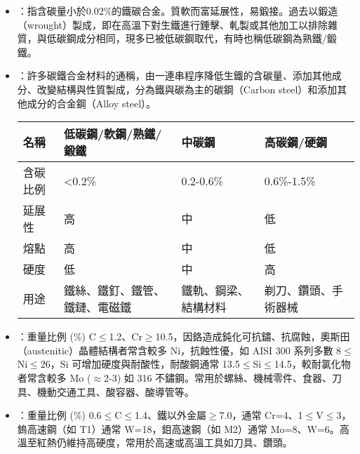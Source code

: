 \documentclass[a4paper,12pt]{report}
\begin{document}
\begin{itemize}
\item {}：指含碳量小於0.02\%的鐵碳合金。質軟而富延展性，易鍛接。過去以鍛造（wrought）製成，即在高溫下對生鐵進行錘擊、軋製或其他加工以排除雜質，與低碳鋼成分相同，現多已被低碳鋼取代，有時也稱低碳鋼為熟鐵/鍛鐵。
\item {}：許多碳鐵合金材料的通稱，由一連串程序降低生鐵的含碳量、添加其他成分、改變結構與性質製成，分為鐵與碳為主的碳鋼（Carbon steel）和添加其他成分的合金鋼（Alloy steel）。
\eit
{}
\begin{longtable}[c]{|p{0.2\tw}|p{0.2\tw}|p{0.2\tw}|p{0.2\tw}|}
\hline
名稱 & 低碳鋼/軟鋼/熟鐵/鍛鐵 & 中碳鋼 & 高碳鋼/硬鋼 \\\hline
含碳比例 & <0.2\% & 0.2-0.6\% & 0.6\%-1.5\% \\\hline
延展性 & 高 & 中 & 低 \\\hline
熔點 & 高 & 中 & 低 \\\hline
硬度 & 低 & 中 & 高 \\\hline
用途 & 鐵絲、鐵釘、鐵管、鐵鏈、電磁鐵 & 鐵軌、鋼梁、結構材料 & 剃刀、鑽頭、手術器械 \\\hline
\end{longtable}\FloatBarrier
{}
\bit
\item {}：重量比例 (\%) C$\leq$1.2、Cr$\geq$10.5，因鉻造成鈍化可抗鏽、抗腐蝕，奧斯田（austenitic）晶體結構者常含較多 Ni，抗蝕性優，如 AISI 300 系列多數 8$\leq$Ni$\leq$26，Si 可增加硬度與耐酸性，耐酸鋼通常 13.5$\leq$Si$\leq$14.5，較耐氯化物者常含較多 Mo ($\approx$2-3) 如 316 不鏽鋼。常用於螺絲、機械零件、食器、刀具、機動交通工具、酸容器、酸導管等。
\item {}：重量比例 (\%) 0.6$\leq$C$\leq$1.4、鐵以外金屬$\geq$7.0，通常 Cr=4、1$\leq$V$\leq$3，鎢高速鋼（如 T1）通常 W=18，鉬高速鋼（如 M2）通常 Mo=8、W=6。高溫至紅熱仍維持高硬度，常用於高速或高溫工具如刀具、鑽頭。
\eit


\end{itemize}
\end{document}
